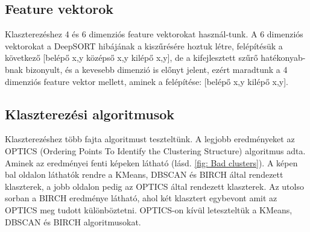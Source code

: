 \documentclass[acmtog, authorversion]{acmart}
\begin{document}
\subsection{Feature vektorok}
Klaszterezéshez 4 és 6 dimenziós feature vektorokat használ-tunk. A 6 dimenziós vektorokat a DeepSORT hibájának a kiszűrésére hoztuk
létre, felépítésük a következő [belépő x,y középső x,y kilépő x,y], de a kifejlesztett szűrő hatékonyab-bnak bizonyult, és a kevesebb dimenzió is előnyt jelent,
ezért maradtunk a 4 dimenziós feature vektor mellett, aminek a felépítése: [belépő x,y kilépő x,y].
\subsection{Klaszterezési algoritmusok}
Klaszterezéshez több fajta algoritmust teszteltünk. A legjobb eredményeket az OPTICS (Ordering Points To Identify the Clustering Structure) \cite{10.1145/304181.304187} algoritmus adta. 
Aminek az eredményei fenti képeken látható (lásd. \ref{fig: Bad clusters}). A képen bal oldalon láthatók rendre a KMeans, DBSCAN és BIRCH által rendezett klaszterek, a jobb oldalon pedig az OPTICS által rendezett klaszterek. Az utolso sorban a BIRCH eredménye látható, ahol két klasztert egybevont amit az OPTICS meg tudott különböztetni.
OPTICS-on kívül leteszteltük a KMeans, DBSCAN és BIRCH algoritmusokat. 
\end{document}
